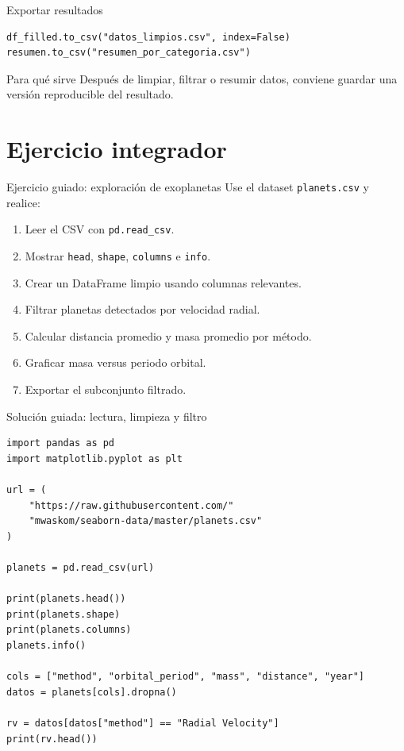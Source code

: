 \documentclass[10pt]{beamer}
\begin{document}
\begin{frame}[fragile]{Exportar resultados}
\begin{verbatim}
df_filled.to_csv("datos_limpios.csv", index=False)
resumen.to_csv("resumen_por_categoria.csv")
\end{verbatim}

  \begin{block}{Para qué sirve}
    Después de limpiar, filtrar o resumir datos, conviene guardar una versión reproducible del resultado.
  \end{block}
\end{frame}

\section{Ejercicio integrador}

\begin{frame}{Ejercicio guiado: exploración de exoplanetas}
  Use el dataset \texttt{planets.csv} y realice:
  \begin{enumerate}
    \item Leer el CSV con \texttt{pd.read\_csv}.
    \item Mostrar \texttt{head}, \texttt{shape}, \texttt{columns} e \texttt{info}.
    \item Crear un DataFrame limpio usando columnas relevantes.
    \item Filtrar planetas detectados por velocidad radial.
    \item Calcular distancia promedio y masa promedio por método.
    \item Graficar masa versus periodo orbital.
    \item Exportar el subconjunto filtrado.
  \end{enumerate}
\end{frame}

\begin{frame}[fragile,shrink=5]{Solución guiada: lectura, limpieza y filtro}
\begin{verbatim}
import pandas as pd
import matplotlib.pyplot as plt

url = (
    "https://raw.githubusercontent.com/"
    "mwaskom/seaborn-data/master/planets.csv"
)

planets = pd.read_csv(url)

print(planets.head())
print(planets.shape)
print(planets.columns)
planets.info()

cols = ["method", "orbital_period", "mass", "distance", "year"]
datos = planets[cols].dropna()

rv = datos[datos["method"] == "Radial Velocity"]
print(rv.head())
\end{verbatim}
\end{frame}
\end{document}
